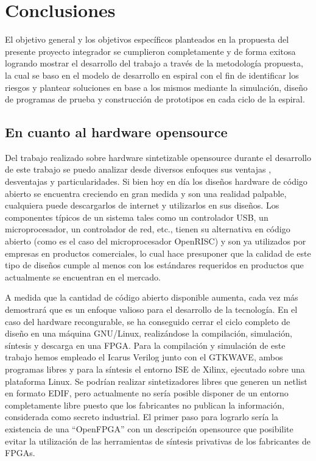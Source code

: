  \chapter{Conclusiones}

El objetivo general y los objetivos específicos planteados en la propuesta del presente proyecto integrador se cumplieron completamente y de forma
exitosa logrando mostrar el desarrollo del trabajo a través de la metodología propuesta, la cual se baso en el modelo de desarrollo en espiral con el
fin de identificar los riesgos y plantear soluciones en base a los mismos mediante la simulación, diseño de programas de prueba y construcción de
prototipos en cada ciclo de la espiral.
	 
	\section{En cuanto al hardware opensource} 

Del trabajo realizado sobre hardware sintetizable opensource durante el desarrollo de este trabajo se puedo analizar desde diversos enfoques sus
ventajas , desventajas y particularidades. Si bien hoy en día los diseños hardware de código abierto se encuentra creciendo en gran medida y son una
realidad palpable, cualquiera puede descargarlos de internet y utilizarlos en sus diseños. Los componentes típicos de un sistema tales como un
controlador USB, un microprocesador, un controlador de red, etc., tienen su alternativa en código abierto (como es el caso del microprocesador
OpenRISC) y son ya utilizados por empresas en productos comerciales, lo cual hace presuponer que la calidad de este tipo de diseños cumple al menos
con los estándares requeridos en productos que actualmente se encuentran en el mercado.

A medida que la cantidad de código abierto disponible aumenta, cada vez más demostrará que es un enfoque valioso para el desarrollo de la tecnología.
En el caso del hardware recongurable, se ha conseguido cerrar el ciclo completo de diseño en una máquina GNU/Linux, realizándose la compilación,
simulación, síntesis y descarga en una FPGA. Para la compilación y simulación de este trabajo hemos empleado el Icarus Verilog junto con el GTKWAVE,
ambos programas libres y para la síntesis el entorno ISE de Xilinx, ejecutado sobre una plataforma Linux. Se podrían realizar sintetizadores libres
que generen un netlist en formato EDIF, pero actualmente no sería posible disponer de un entorno completamente libre puesto que los fabricantes no
publican la información, considerada como secreto industrial. El primer paso para lograrlo sería la existencia de una ``OpenFPGA'' con un descripción
opensource que posibilite evitar la utilización de las herramientas de síntesis privativas de los fabricantes de FPGAs.

